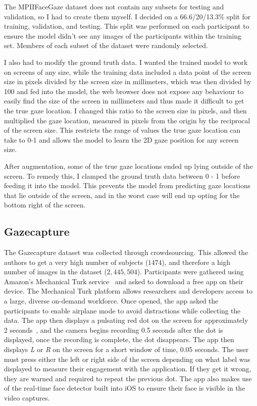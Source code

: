 \documentclass{report}
\begin{document}
The MPIIFaceGaze dataset does not contain any subsets for testing and validation, so I had to create them myself. I decided on a 66.6/20/13.3\% split for training, validation, and testing. This split was performed on each participant to ensure the model didn't see any images of the participants within the training set. Members of each subset of the dataset were randomly selected. 

I also had to modify the ground truth data. I wanted the trained model to work on screens of any size, while the training data included a data point of the screen size in pixels divided by the screen size in millimeters, which was then divided by 100 and fed into the model, the web browser does not expose any behaviour to easily find the size of the screen in millimeters and thus made it difficult to get the true gaze location. I changed this ratio to the screen size in pixels, and then multiplied the gaze location, measured in pixels from the origin by the reciprocal of the screen size. This restricts the range of values the true gaze location can take to 0-1 and allows the model to learn the 2D gaze position for any screen size. 

After augmentation, some of the true gaze locations ended up lying outside of the screen. To remedy this, I clamped the ground truth data between 0 - 1 before feeding it into the model. This prevents the model from predicting gaze locations that lie outside of the screen, and in the worst case will end up opting for the bottom right of the screen. 

\subsection{Gazecapture}\label{sec:gazecapture}

The Gazecapture dataset was collected through crowdsourcing. This allowed the authors to get a very high number of subjects ($1474$), and therefore a high number of images in the dataset ($2,445,504$). Participants were gathered using Amazon's Mechanical Turk service~\cite{mturk} and asked to download a free app on their device. The Mechanical Turk platform allows researchers and developers access to a large, diverse on-demand workforce. Once opened, the app asked the participants to enable airplane mode to avoid distractions while collecting the data. The app then displays a pulsating red dot on the screen for approximately 2 seconds~\cite{krafka2016eye}, and the camera begins recording 0.5 seconds after the dot is displayed, once the recording is complete, the dot disappears. The app then displays \textit{L} or \textit{R} on the screen for a short window of time, 0.05 seconds. The user must press either the left or right side of the screen depending on what label was displayed to measure their engagement with the application. If they get it wrong, they are warned and required to repeat the previous dot. The app also makes use of the real-time face detector built into iOS to ensure their face is visible in the video captures.
\end{document}
